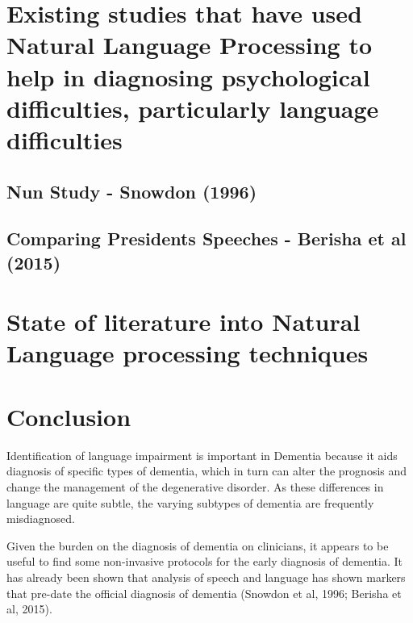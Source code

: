 \documentclass[a4paper]{article}
\begin{document}
\section{Existing studies that have used Natural Language Processing to help in diagnosing psychological difficulties, particularly language difficulties}

\subsection{Nun Study - Snowdon (1996)}
\subsection{Comparing Presidents Speeches - Berisha et al (2015)}

\section{State of literature into Natural Language processing techniques}

\section{Conclusion}
\par
Identification of language impairment is important in Dementia because it aids diagnosis of specific types of dementia, which in turn can alter the prognosis and change the management of the degenerative disorder. As these differences in language are quite subtle, the varying subtypes of dementia are frequently misdiagnosed.
\newline
\par 
Given the burden on the diagnosis of dementia on clinicians, it appears to be useful to find some non-invasive protocols for the early diagnosis of dementia. It has already been shown that analysis of speech and language has shown markers that pre-date the official diagnosis of dementia (Snowdon et al, 1996; Berisha et al, 2015).
\end{document}
